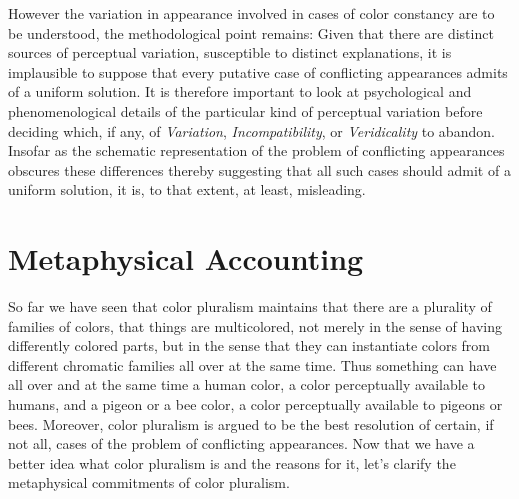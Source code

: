 \documentclass[12pt]{article}
\begin{document}
However the variation in appearance involved in cases of color constancy are to be understood, the methodological point remains: Given that there are distinct sources of perceptual variation, susceptible to distinct explanations, it is implausible to suppose that every putative case of conflicting appearances admits of a uniform solution. It is therefore important to look at psychological and phenomenological details of the particular kind of perceptual variation before deciding which, if any, of \emph{Variation}, \emph{Incompatibility}, or \emph{Veridicality} to abandon. Insofar as the schematic representation of the problem of conflicting appearances obscures these differences thereby suggesting that all such cases should admit of a uniform solution, it is, to that extent, at least, misleading.


\section{Metaphysical Accounting} %
\label{sec:metaphysical_accounting}

So far we have seen that color pluralism maintains that there are a plurality of families of colors, that things are multicolored, not merely in the sense of having differently colored parts, but in the sense that they can instantiate colors from different chromatic families all over at the same time. Thus something can have all over and at the same time a human color, a color perceptually available to humans, and a pigeon or a bee color, a color perceptually available to pigeons or bees. Moreover, color pluralism is argued to be the best resolution of certain, if not all, cases of the problem of conflicting appearances. Now that we have a better idea what color pluralism is and the reasons for it, let's clarify the metaphysical commitments of color pluralism.
\end{document}
